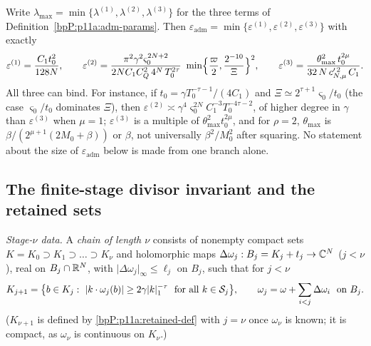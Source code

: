 \begin{remark}\label{bpP:p11a:adm-branches}
Write $\lambda_{\max}=\min\{\lambda^{(1)},\lambda^{(2)},\lambda^{(3)}\}$ for the three terms of Definition~\ref{bpP:p11a:adm-params}. Then $\varepsilon_{\mathrm{adm}}=\min\{\varepsilon^{(1)},\varepsilon^{(2)},\varepsilon^{(3)}\}$ with exactly
\[\varepsilon^{(1)}=\frac{C_1t_0^2}{128N},\qquad\varepsilon^{(2)}=\frac{\pi^2\gamma^2\varsigma_0^{2N+2}}{2NC_1C_Q^2\,4^{N}\,T_0^{2\tau}}\ \min\Bigl\{\frac\varpi2,\frac{2^{-10}}\Xi\Bigr\}^2,\qquad\varepsilon^{(3)}=\frac{\theta_{\max}^2\,t_0^{2\mu}}{32\,N\,c_{N,\mu}'^{\,2}\,C_1}.\]
All three can bind. For instance, if $t_0=\gamma T_0^{-\tau-1}/(4C_1)$ and $\Xi\simeq2^{\tau+1}\varsigma_0/t_0$ (the case $\varsigma_0/t_0$ dominates $\Xi$), then $\varepsilon^{(2)}\asymp\gamma^{4}\varsigma_0^{2N}C_1^{-3}T_0^{-4\tau-2}$, of higher degree in $\gamma$ than $\varepsilon^{(3)}$ when $\mu=1$; $\varepsilon^{(3)}$ is a multiple of $\theta_{\max}^2t_0^{2\mu}$, and for $\rho=2$, $\theta_{\max}$ is $\beta/(2^{\mu+1}(2M_0+\beta))$ or $\beta$, not universally $\beta^2/M_0^2$ after squaring. No statement about the size of $\varepsilon_{\mathrm{adm}}$ below is made from one branch alone.
\end{remark}

\subsection{The finite-stage divisor invariant and the retained sets}\label{bpP:p11a:sec-retained}

\emph{Stage-$\nu$ data.} A \emph{chain of length $\nu$} consists of nonempty compact sets $K=K_0\supset K_1\supset\dots\supset K_\nu$ and holomorphic maps $\Delta\omega_j:B_j=K_j+t_j\to\mathbb{C}^N$ ($j<\nu$), real on $B_j\cap\mathbb{R}^N$, with $\lvert\Delta\omega_j\rvert_\infty\le\ell_j$ on $B_j$, such that for $j<\nu$
\begin{equation}\label{bpP:p11a:retained-def}
K_{j+1}=\bigl\{b\in K_j:\ \lvert k\cdot\omega_j(b)\rvert\ge2\gamma\lvert k\rvert_1^{-\tau}\ \text{ for all }k\in\Sh_j\bigr\},\qquad\omega_j=\omega+\sum_{i<j}\Delta\omega_i\ \text{ on }B_j.
\end{equation}
($K_{\nu+1}$ is defined by \eqref{bpP:p11a:retained-def} with $j=\nu$ once $\omega_\nu$ is known; it is compact, as $\omega_\nu$ is continuous on $K_\nu$.)

